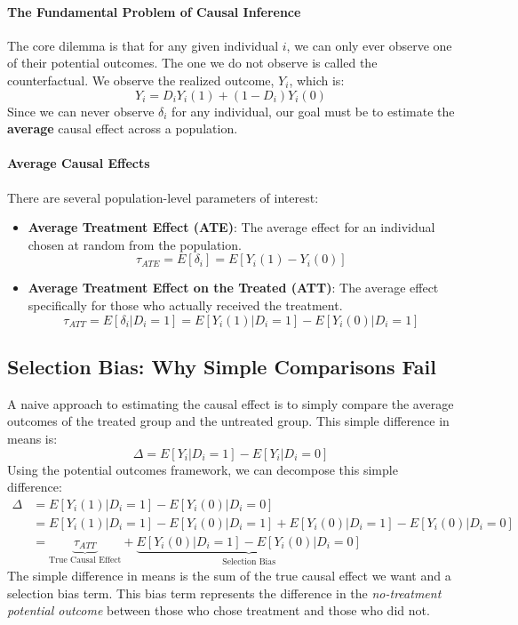 \documentclass{article}
\providecommand{\tightlist}{
  \setlength{\itemsep}{0pt}
  \setlength{\parskip}{0pt}}
\begin{document}
\paragraph{The Fundamental Problem of Causal Inference}
The core dilemma is that for any given individual $i$, we can only ever observe one of their potential outcomes. The one we do not observe is called the counterfactual. We observe the realized outcome, $Y_i$, which is:
\begin{equation}
    Y_i = D_i Y_i(1) + (1-D_i) Y_i(0)
\end{equation}
Since we can never observe $\delta_i$ for any individual, our goal must be to estimate the \textbf{average} causal effect across a population.

\paragraph{Average Causal Effects}
There are several population-level parameters of interest:
\begin{itemize}
    \tightlist
    \item \textbf{Average Treatment Effect (ATE)}: The average effect for an individual chosen at random from the population.
    \begin{equation}
        \tau_{ATE} = E[\delta_i] = E[Y_i(1) - Y_i(0)]
    \end{equation}
    \item \textbf{Average Treatment Effect on the Treated (ATT)}: The average effect specifically for those who actually received the treatment.
    \begin{equation}
        \tau_{ATT} = E[\delta_i | D_i=1] = E[Y_i(1)|D_i=1] - E[Y_i(0)|D_i=1]
    \end{equation}
\end{itemize}

\subsection{Selection Bias: Why Simple Comparisons Fail}
\label{sub:selection_bias}

A naive approach to estimating the causal effect is to simply compare the average outcomes of the treated group and the untreated group. This simple difference in means is:
\begin{equation}
    \Delta = E[Y_i | D_i=1] - E[Y_i | D_i=0]
\end{equation}
Using the potential outcomes framework, we can decompose this simple difference:
\begin{align}
    \Delta &= E[Y_i(1) | D_i=1] - E[Y_i(0) | D_i=0] \\
    &= E[Y_i(1) | D_i=1] - E[Y_i(0)|D_i=1] + E[Y_i(0)|D_i=1] - E[Y_i(0) | D_i=0] \\
    &= \underbrace{\tau_{ATT}}_{\text{True Causal Effect}} + \underbrace{E[Y_i(0)|D_i=1] - E[Y_i(0) | D_i=0]}_{\text{Selection Bias}}
\end{align}
The simple difference in means is the sum of the true causal effect we want and a selection bias term. This bias term represents the difference in the \textit{no-treatment potential outcome} between those who chose treatment and those who did not.
\end{document}
